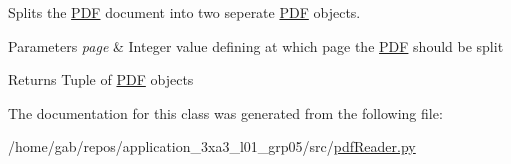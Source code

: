 Splits the \hyperlink{classpdfReader_1_1PDF}{P\+DF} document into two seperate \hyperlink{classpdfReader_1_1PDF}{P\+DF} objects. 


\begin{DoxyParams}{Parameters}
{\em page} & Integer value defining at which page the \hyperlink{classpdfReader_1_1PDF}{P\+DF} should be split \\
\hline
\end{DoxyParams}
\begin{DoxyReturn}{Returns}
Tuple of \hyperlink{classpdfReader_1_1PDF}{P\+DF} objects 
\end{DoxyReturn}


The documentation for this class was generated from the following file\+:\begin{DoxyCompactItemize}
\item 
/home/gab/repos/application\+\_\+3xa3\+\_\+l01\+\_\+grp05/src/\hyperlink{pdfReader_8py}{pdf\+Reader.\+py}\end{DoxyCompactItemize}
